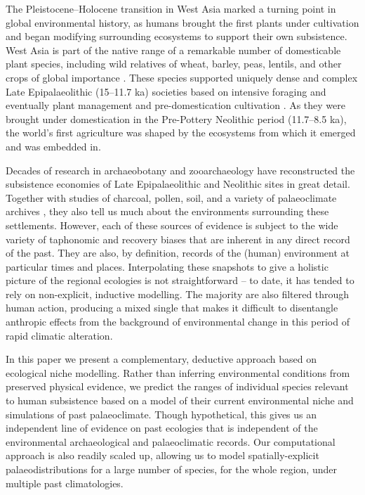 \documentclass[
  authoryear,
  preprint]{elsarticle}
\begin{document}
The Pleistocene--Holocene transition in West Asia marked a turning point
in global environmental history, as humans brought the first plants
under cultivation and began modifying surrounding ecosystems to support
their own subsistence. West Asia is part of the native range of a
remarkable number of domesticable plant species, including wild
relatives of wheat, barley, peas, lentils, and other crops of global
importance \citep{Diamond2002}. These species supported uniquely dense
and complex Late Epipalaeolithic (15--11.7 ka) societies based on
intensive foraging \citep{BarYosef1998, MaherEtAl2012} and eventually
plant management and pre-domestication cultivation \citep{Harris2007}.
As they were brought under domestication in the Pre-Pottery Neolithic
period (11.7--8.5 ka), the world's first agriculture was shaped by the
ecosystems from which it emerged and was embedded in.

Decades of research in archaeobotany and zooarchaeology have
reconstructed the subsistence economies of Late Epipalaeolithic and
Neolithic sites in great detail. Together with studies of charcoal,
pollen, soil, and a variety of palaeoclimate archives
\citep{JonesEtAl2019}, they also tell us much about the environments
surrounding these settlements. However, each of these sources of
evidence is subject to the wide variety of taphonomic and recovery
biases that are inherent in any direct record of the past. They are
also, by definition, records of the (human) environment at particular
times and places. Interpolating these snapshots to give a holistic
picture of the regional ecologies is not straightforward -- to date, it
has tended to rely on non-explicit, inductive modelling. The majority
are also filtered through human action, producing a mixed single that
makes it difficult to disentangle anthropic effects from the background
of environmental change in this period of rapid climatic alteration.

In this paper we present a complementary, deductive approach based on
ecological niche modelling. Rather than inferring environmental
conditions from preserved physical evidence, we predict the ranges of
individual species relevant to human subsistence based on a model of
their current environmental niche and simulations of past palaeoclimate.
Though hypothetical, this gives us an independent line of evidence on
past ecologies that is independent of the environmental archaeological
and palaeoclimatic records. Our computational approach is also readily
scaled up, allowing us to model spatially-explicit palaeodistributions
for a large number of species, for the whole region, under multiple past
climatologies.
\end{document}
